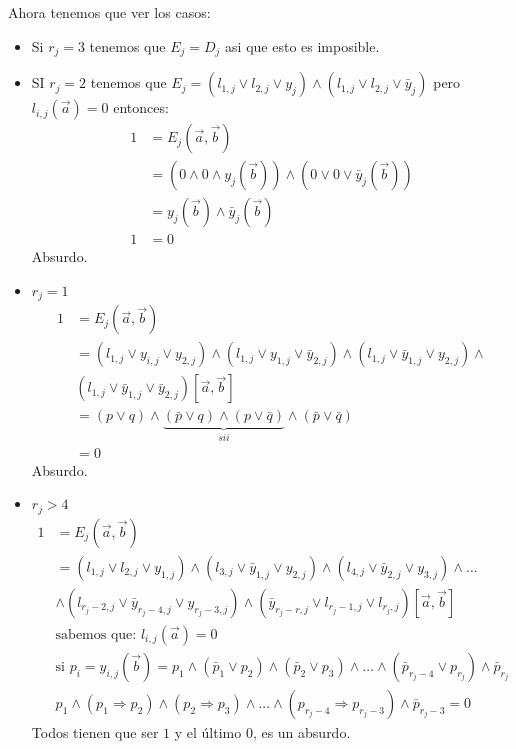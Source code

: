 \documentclass[12pt,a4paper]{article}
\begin{document}
Ahora tenemos que ver los casos:
\begin{itemize}
    \item Si $r_{j} = 3$ tenemos que $E_{j} = D_{j}$ asi que esto es imposible.
    \item SI $r_{j} = 2$ tenemos que 
        $E_{j} = (l_{1,j} \vee l_{2,j} \vee y_{j}) \wedge (l_{1,j} \vee l_{2,j} \vee \bar{y}_{j})$
        pero $l_{i,j}(\overrightarrow{a}) = 0$ entonces:
        \begin{align*}
            1 &= E_{j}(\overrightarrow{a},\overrightarrow{b}) \\
            &= (0 \wedge 0 \wedge y_{j}(\overrightarrow{b})) \wedge (0 \vee 0 \vee \bar{y}_{j}(\overrightarrow{b}))\\
            &= y_{j}(\overrightarrow{b}) \wedge \bar{y}_{j}(\overrightarrow{b})\\
            1 &= 0
        \end{align*}
        Absurdo.
    \item $r_{j} =1$
        \begin{align*}
            1 &= E_{j}(\overrightarrow{a},\overrightarrow{b}) \\
            &=(l_{1,j} \vee y_{i,j} \vee y_{2,j}) \wedge (l_{1,j} \vee y_{1,j} \vee \bar{y}_{2,j}) \wedge (l_{1,j} \vee \bar{y}_{1,j} \vee y_{2,j}) \wedge \\ 
            &(l_{1,j} \vee \bar{y}_{1,j} \vee \bar{y}_{2,j})[\overrightarrow{a},\overrightarrow{b}]\\
            &=(p \vee q) \wedge \underbrace{(\bar{p} \vee q) \wedge (p \vee \bar{q})}_{sii} \wedge (\bar{p} \vee \bar{q}) \\
            &=0
        \end{align*}
        Absurdo.
    \item $r_{j} > 4$
        \begin{align*}
            1 &= E_{j}(\overrightarrow{a},\overrightarrow{b}) \\
            &= (l_{1,j} \vee l_{2,j} \vee y_{1,j}) \wedge (l_{3,j} \vee \bar{y}_{1,j} \vee y_{2,j}) \wedge (l_{4,j} \vee \bar{y}_{2,j} \vee y_{3,j}) \wedge \ldots \\ 
            &\wedge (l_{r_{j}-2,j} \vee \bar{y}_{r_{j}-4,j} \vee y_{r_{j}-3,j}) \wedge (\bar{y}_{r_{j}-r,j} \vee l_{r_{j}-1,j} \vee l_{r_{j},j})[\overrightarrow{a},\overrightarrow{b}]\\
            & \text{sabemos que:}\,\, l_{i,j}(\overrightarrow{a}) = 0\\
            & \text{si}\,\, p_{i} = y_{i,j}(\overrightarrow{b}) = p_{1} \wedge (\bar{p}_{1} \vee p_{2}) \wedge (\bar{p}_{2} \vee p_{3}) \wedge \ldots \wedge (\bar{p}_{r_{j}-4} \vee p_{r_{j}}) \wedge \bar{p}_{r_{j}}\\
            & p_{1} \wedge (p_{1} \Rightarrow p_{2}) \wedge (p_{2} \Rightarrow p_{3}) \wedge \ldots \wedge (p_{r_{j}-4} \Rightarrow p_{r_{j}-3}) \wedge \bar{p}_{r_{j}-3} =0
        \end{align*}
        Todos tienen que ser $1$ y el último $0$, es un absurdo.
\end{itemize}
\end{document}
